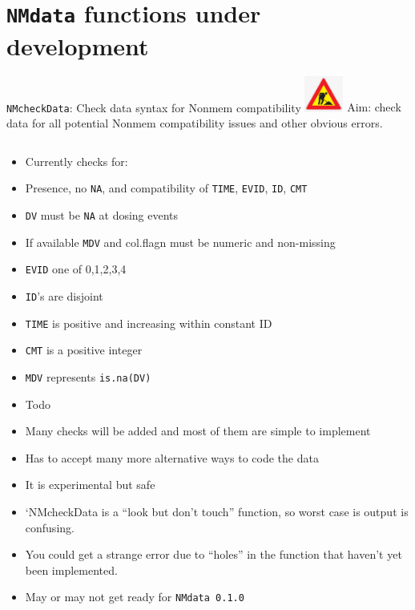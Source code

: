 \documentclass[
  8pt,
  ignorenonframetext,
  aspectratio=169]{beamer}
\begin{document}
\hypertarget{nmdata-functions-under-development}{%
\section{\texorpdfstring{\texttt{NMdata} functions under
development}{NMdata functions under development}}\label{nmdata-functions-under-development}}

\begin{frame}[fragile]{\texttt{NMcheckData}: Check data syntax for
Nonmem compatibility
\includegraphics[width=0.5in]{figures/worksign.png}}
\protect\hypertarget{nmcheckdata-check-data-syntax-for-nonmem-compatibility}{}
Aim: check data for all potential Nonmem compatibility issues and other
obvious errors.

\begin{columns}[T]
\begin{column}{0.48\textwidth}
\begin{itemize}
\item
  Currently checks for:
\item
  Presence, no \texttt{NA}, and compatibility of \texttt{TIME},
  \texttt{EVID}, \texttt{ID}, \texttt{CMT}
\item
  \texttt{DV} must be \texttt{NA} at dosing events
\item
  If available \texttt{MDV} and col.flagn must be numeric and
  non-missing
\item
  \texttt{EVID} one of 0,1,2,3,4
\item
  \texttt{ID}'s are disjoint
\item
  \texttt{TIME} is positive and increasing within constant ID
\item
  \texttt{CMT} is a positive integer
\item
  \texttt{MDV} represents \texttt{is.na(DV)}
\item
  Todo
\item
  Many checks will be added and most of them are simple to implement
\item
  Has to accept many more alternative ways to code the data
\item
  It is experimental but safe
\item
  `NMcheckData is a ``look but don't touch'' function, so worst case is
  output is confusing.
\item
  You could get a strange error due to ``holes'' in the function that
  haven't yet been implemented.
\item
  May or may not get ready for \texttt{NMdata\ 0.1.0}
\end{itemize}
\end{column}


\end{columns}
\end{frame}
\end{document}
